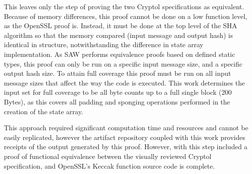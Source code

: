 This leaves only the step of proving the two Cryptol specifications as equivalent.
Because of memory differences, this proof cannot be done on a low function level, as the OpenSSL proof is.
Instead, it must be done at the top level of the SHA algorithm so that the memory compared (input message and output hash) is identical in structure, notwithstanding the difference in state array implementation.
As SAW performs equivalence proofs based on defined static types, this proof can only be run on a specific input message size, and a specific output hash size.
To attain full coverage this proof must be run on all input message sizes that affect the way the code is executed.
This work determines the input set for full coverage to be all byte counts up to a full single block (200 Bytes), as this covers all padding and sponging operations performed in the creation of the state array.

This approach required significant computation time and resources and cannot be easily replicated, however the artifact repository coupled with this work provides receipts of the output generated by this proof.
However, with this step included a proof of functional equivalence between the visually reviewed Cryptol specification, and OpenSSL's Keccak function source code is complete.
